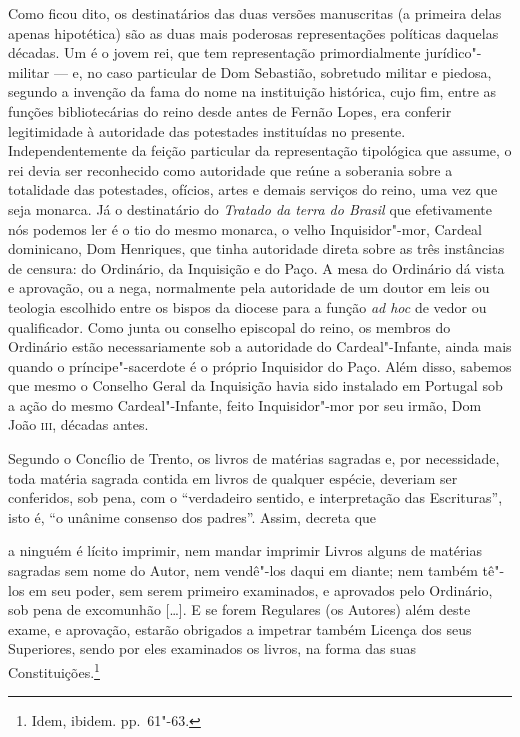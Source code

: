 Como ficou dito, os destinatários das duas versões manuscritas (a
primeira delas apenas hipotética) são as duas mais poderosas
representações políticas daquelas décadas. Um é o jovem rei, que tem
representação primordialmente jurídico"-militar --- e, no caso particular
de Dom Sebastião, sobretudo militar e piedosa, segundo a invenção da
fama do nome na instituição histórica, cujo fim, entre as funções
bibliotecárias do reino desde antes de Fernão Lopes, era conferir
legitimidade à autoridade das potestades instituídas no presente.
Independentemente da feição particular da representação tipológica que
assume, o rei devia ser reconhecido como autoridade que reúne a
soberania sobre a totalidade das potestades, ofícios, artes e demais
serviços do reino, uma vez que seja monarca. Já o destinatário do
\textit{Tratado da terra do Brasil} que efetivamente nós podemos ler é o tio do
mesmo monarca, o velho Inquisidor"-mor, Cardeal dominicano, Dom
Henriques, que tinha autoridade direta sobre as três instâncias de
censura: do Ordinário, da Inquisição e do Paço. A mesa do Ordinário dá
vista e aprovação, ou a nega, normalmente pela autoridade de um doutor
em leis ou teologia escolhido entre os bispos da diocese para a função
\textit{ad hoc} de vedor ou qualificador. Como junta ou conselho episcopal do
reino, os membros do Ordinário estão necessariamente sob a autoridade
do Cardeal"-Infante, ainda mais quando o príncipe"-sacerdote é o próprio
Inquisidor do Paço. Além disso, sabemos que mesmo o Conselho Geral da
Inquisição havia sido instalado em Portugal sob a ação do mesmo
Cardeal"-Infante, feito Inquisidor"-mor por seu irmão, Dom João \textsc{iii},
décadas antes. 

Segundo o Concílio de Trento, os livros de matérias sagradas e, por
necessidade, toda matéria sagrada contida em livros de qualquer
espécie, deveriam ser conferidos, sob pena, com o ``verdadeiro sentido, 
e interpretação das Escrituras'', isto é, ``o unânime consenso
dos padres''. Assim, decreta que 

\begin{hedraquote}
a ninguém é lícito imprimir, nem mandar imprimir Livros alguns de
matérias sagradas sem nome do Autor, nem vendê"-los daqui em diante;
nem também tê"-los em seu poder, sem serem primeiro examinados, e
aprovados pelo Ordinário, sob pena de excomunhão [\ldots{}]. E se forem
Regulares (os Autores) além deste exame, e aprovação, estarão
obrigados a impetrar também Licença dos seus Superiores, sendo por
eles examinados os livros, na forma das suas Constituições.\footnote{ Idem, ibidem. pp.~61"-63.}
\end{hedraquote}

